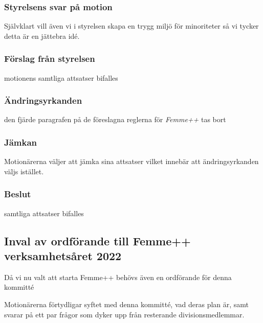 \documentclass[protokoll]{dvd}
\begin{document}
    \subsubsection*{Styrelsens svar på motion}
    Självklart vill även vi i styrelsen skapa en trygg miljö för minoriteter så vi tycker detta är en jättebra idé.

    \subsubsection*{Förslag från styrelsen}
        \begin{attsatser}
            \item motionens samtliga attsatser bifalles
        \end{attsatser}

        \subsubsection*{Ändringsyrkanden}
        \begin{attsatser}
            \item den fjärde paragrafen på de föreslagna reglerna för \emph{Femme++} tas bort
        \end{attsatser}

        \subsubsection*{Jämkan}
        Motionärerna väljer att jämka sina attsatser vilket innebär att ändringsyrkanden väljs istället.

        \subsubsection*{Beslut}
        \begin{attsatser}
            \item samtliga attsatser bifalles
        \end{attsatser}

\subsection{Inval av ordförande till Femme++ verksamhetsåret 2022}
Då vi nu valt att starta Femme++ behövs även en ordförande för denna kommitté

Motionärerna förtydligar syftet med denna kommitté, vad deras plan är, samt svarar på ett par frågor som dyker upp från resterande divisionsmedlemmar.
\end{document}
